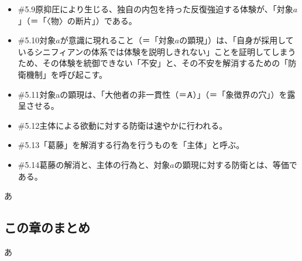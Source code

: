 \begin{note}{}
\begin{itemize}
    \item{\#5.9}原抑圧により生じる、独自の内包を持った反復強迫する体験が、「対象$a$」（＝「〈物〉の断片」）である。
    \item{\#5.10}対象$a$が意識に現れること（＝「対象$a$の顕現」）は、「自身が採用しているシニフィアンの体系では体験を説明しきれない」ことを証明してしまうため、その体験を統御できない「不安」と、その不安を解消するための「防衛機制」を呼び起こす。
    \item{\#5.11}対象aの顕現は、「大他者の非一貫性（＝Ⱥ）」（＝「象徴界の穴」）を露呈させる。
    \item{\#5.12}主体による欲動に対する防衛は速やかに行われる。
    \item{\#5.13}「葛藤」を解消する行為を行うものを「主体」と呼ぶ。
    \item{\#5.14}葛藤の解消と、主体の行為と、対象$a$の顕現に対する防衛とは、等価である。
  \end{itemize}
\end{note}

あ

\subsection{この章のまとめ}\label{ux3053ux306eux7ae0ux306eux307eux3068ux3081}

あ
